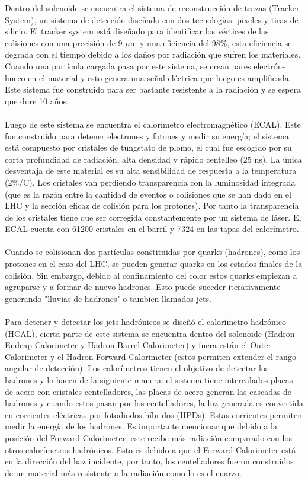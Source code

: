 Dentro del solenoide se encuentra el sistema de reconstrucción de trazas (Tracker System), un sistema de detección diseñado con dos tecnologías: pixeles y tiras de silicio. El tracker system está diseñado para identificar los vértices de las colisiones con una precisión de 9 $\mu$m y una eficiencia del 98\%, esta eficiencia se degrada con el tiempo debido a los daños por radiación que sufren los materiales. Cuando una partícula cargada pasa por este sistema, se crean pares electrón-hueco en el material y esto genera una señal eléctrica que luego es amplificada. Este sistema fue construido para ser bastante resistente a la radiación y se espera que dure 10 años.
\\
\\
Luego de este sistema se encuentra el calorímetro electromagnético (ECAL). Este fue construido para detener electrones y fotones y medir su energía; el sistema está compuesto por cristales de tungstato de plomo, el cual fue escogido por su corta profundidad de radiación, alta densidad y rápido centelleo (25 ns). La única desventaja de este material es su alta sensibilidad de respuesta a la temperatura (2\%/C). Los cristales van perdiendo transparencia con la luminosidad integrada (que es la razón entre la cantidad de eventos o colisiones que se han dado en el LHC y la sección eficaz de colisión para los protones\cite{Jose}). Por tanto la transparencia de los cristales tiene que ser corregida constantemente por un sistema de láser. El ECAL cuenta con 61200 cristales en el barril y 7324 en las tapas del calorímetro.
\\
\\
Cuando se colisionan dos partículas constituidas por quarks (hadrones), como los protones en el caso del LHC, se pueden generar quarks en los estados finales de la colisión. Sin embargo, debido al confinamiento del color estos quarks empiezan a agruparse y a formar de nuevo hadrones. Esto puede suceder iterativamente generando "lluvias de hadrones" o tambien llamados jets.
\\
\\
Para detener y detectar los jets hadrónicos se diseñó el calorímetro hadrónico (HCAL), cierta parte de este sistema se encuentra dentro del solenoide (Hadron Endcap Calorimeter y Hadron Barrel Calorimeter) y fuera están el Outer Calorimeter y el Hadron Forward Calorimeter (estos permiten extender el rango angular de detección). Los calorímetros tienen el objetivo de detectar los hadrones y lo hacen de la siguiente manera: el sistema tiene intercalados placas de acero con cristales centelladores, las placas de acero generan las cascadas de hadrones y cuando estos pasan por los centelladores, la luz generada es convertida en corrientes eléctricas por fotodiodos híbridos (HPDs). Estas corrientes permiten medir la energía de los hadrones. Es importante mencionar que debido a la posición del Forward Calorimeter, este recibe más radiación comparado con los otros calorímetros hadrónicos. Esto es debido a que el Forward Calorimeter está en la dirección del haz incidente, por tanto, los centelladores fueron construidos de un material más resistente a la radiación como lo es el cuarzo.
